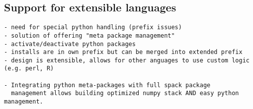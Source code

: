 
\subsection{Support for extensible languages}
\label{sec:usecase-python}


\begin{verbatim}
- need for special python handling (prefix issues)
- solution of offering "meta package management"
- activate/deactivate python packages
- installs are in own prefix but can be merged into extended prefix
- design is extensible, allows for other anguages to use custom logic (e.g. perl, R)

- Integrating python meta-packages with full spack package
  management allows building optimized numpy stack AND easy python management.
\end{verbatim}
